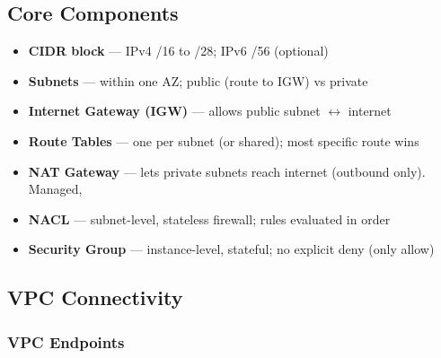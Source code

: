 

\subsection{Core Components}

\begin{keyfacts}
\begin{itemize}
  \item \textbf{CIDR block} — IPv4 /16 to /28; IPv6 /56 (optional)
  \item \textbf{Subnets} — within one AZ; public (route to IGW) vs private
  \item \textbf{Internet Gateway (IGW)} — allows public subnet $\leftrightarrow$ internet
  \item \textbf{Route Tables} — one per subnet (or shared); most specific route wins
  \item \textbf{NAT Gateway} — lets private subnets reach internet (outbound only).
        Managed, 
  \item \textbf{NACL} — subnet-level, stateless firewall; rules evaluated in order
  \item \textbf{Security Group} — instance-level, stateful; no explicit deny (only allow)
\end{itemize}
\end{keyfacts}

\subsection{VPC Connectivity}


\subsubsection{VPC Endpoints}

